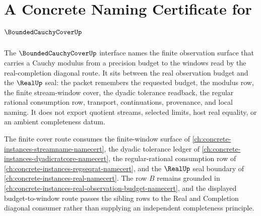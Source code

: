 \chapter{A Concrete Naming Certificate for $\BoundedCauchyCoverUp$}
\label{ch:concrete-instances-bounded-cauchy-cover-namecert}

The $\BoundedCauchyCoverUp$ interface names the finite observation surface that carries a Cauchy modulus from a precision budget to the windows read by the real-completion diagonal route. It sits between the real observation budget and the $\RealUp$ seal: the packet remembers the requested budget, the modulus row, the finite stream-window cover, the dyadic tolerance readback, the regular rational consumption row, transport, continuations, provenance, and local naming. It does not export quotient streams, selected limits, host real equality, or an ambient completeness datum.

The finite cover route consumes the finite-window surface of \autoref{ch:concrete-instances-streamname-namecert}, the dyadic tolerance ledger of \autoref{ch:concrete-instances-dyadicratcore-namecert}, the regular-rational consumption row of \autoref{ch:concrete-instances-regseqrat-namecert}, and the $\RealUp$ seal boundary of \autoref{ch:concrete-instances-real-namecert}. The row $B$ remains grounded in \autoref{ch:concrete-instances-real-observation-budget-namecert}, and the displayed budget-to-window route passes the sibling rows to the Real and Completion diagonal consumer rather than supplying an independent completeness principle.

